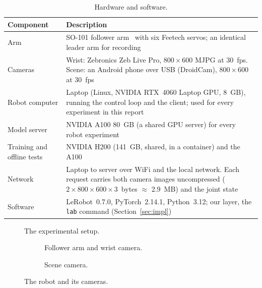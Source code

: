 \begin{table}[htbp]
  \centering
  \caption{Hardware and software.}
  \label{tab:hardware}
  \begin{tabularx}{\textwidth}{l X}
    \toprule
    Component & Description \\
    \midrule
    Arm & SO-101 follower arm~\cite{so101} with six Feetech servos; an identical leader arm for recording \\
    Cameras & Wrist: Zebronics Zeb Live Pro, $800\times600$ MJPG at 30~fps. Scene: an Android phone over USB
              (DroidCam), $800\times600$ at 30~fps \\
    Robot computer & Laptop (Linux, NVIDIA RTX~4060 Laptop GPU, 8~GB), running the control loop and the client;
                     used for every experiment in this report \\
    Model server & NVIDIA A100 80~GB (a shared GPU server) for every robot experiment \\
    Training and offline tests & NVIDIA H200 (141~GB, shared, in a container) and the A100 \\
    Network & Laptop to server over WiFi and the local network. Each request carries both camera images
              uncompressed ($2\times800\times600\times3$~bytes $\approx$ 2.9~MB) and the joint state \\
    Software & LeRobot~0.7.0, PyTorch~2.14.1, Python~3.12; our layer, the \texttt{lab} command (Section~\ref{sec:impl}) \\
    \bottomrule
  \end{tabularx}
\end{table}

\begin{figure}[htbp]
  \centering
  \caption{The experimental setup.}
  \label{fig:setup}
\end{figure}

\begin{figure}[htbp]
  \centering
  \begin{subfigure}[t]{0.48\textwidth}
    \centering
    \caption{Follower arm and wrist camera.}
  \end{subfigure}\hfill
  \begin{subfigure}[t]{0.48\textwidth}
    \centering
    \caption{Scene camera.}
  \end{subfigure}
  \caption{The robot and its cameras.}
  \label{fig:robot}
\end{figure}

